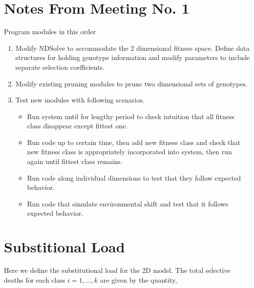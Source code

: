 \documentclass{article}
\begin{document}
\section*{Notes From Meeting No. 1}
Program modules in this order
\begin{enumerate}
\item{Modify NDSolve to accommodate the 2 dimensional fitness space.  Define data structures for holding genotype information and modify parameters to include separate selection coefficients.}
\item{Modify existing pruning modules to prune two dimensional sets of genotypes.}
\item{Test new modules with following scenarios.}
\begin{itemize}
\item{Run system until for lengthy period to check intuition that all fitness class disappear except fittest one.}
\item{Run code up to certain time, then add new fitness class and check that new fitness class is appropriately incorporated into system, then run again until fittest class remains.}
\item{Run code along individual dimensions to test that they follow expected behavior.}
\item{Run code that simulate environmental shift and test that it follows expected behavior.}
\end{itemize}
\end{enumerate}

\section{Substitional Load}
Here we define the substitutional load for the 2D model.  The total selective deaths for each class $i=1,...,k$ are given by the quantity,
\[

\]
\begin{equation}

\end{equation}



\end{document}
